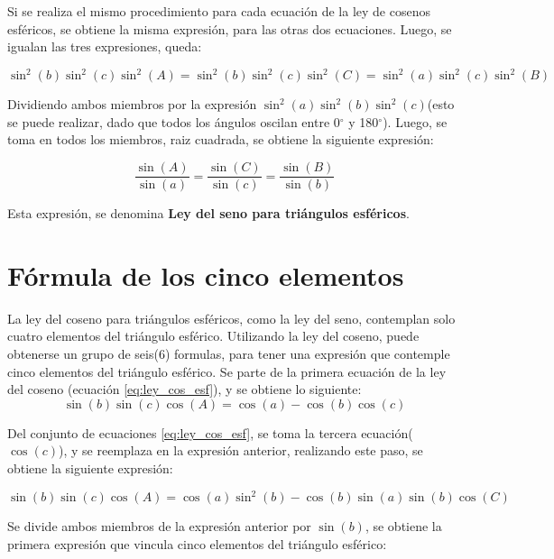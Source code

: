 Si se realiza el mismo procedimiento para cada ecuación de la ley de cosenos esféricos, se obtiene la misma expresión, para las otras dos ecuaciones. Luego, se igualan las tres expresiones, queda: 

\begin{equation*}
	\sin^2(b)\sin^2(c)\sin^2(A) = \sin^2(b)\sin^2(c)\sin^2(C) = \sin^2(a)\sin^2(c)\sin^2(B)   
\end{equation*}

Dividiendo ambos miembros por la expresión $\sin^2(a)\sin^2(b)\sin^2(c)$(esto se puede realizar, dado que todos los ángulos oscilan entre 0$^\circ$ y 180$^\circ$). Luego, se toma en todos los miembros, raiz cuadrada, se obtiene la siguiente expresión: 

\begin{equation}
	\frac{\sin(A)}{\sin(a)} = \frac{\sin(C)}{\sin(c)} = \frac{\sin(B)}{\sin(b)}   
\end{equation}  

Esta expresión, se denomina \textbf{Ley del seno para triángulos esféricos}.


\section{Fórmula de los cinco elementos} 

La ley del coseno para triángulos esféricos, como la ley del seno, contemplan solo cuatro elementos del triángulo esférico. Utilizando la ley del coseno, puede obtenerse un grupo de seis(6) formulas, para tener una expresión que contemple cinco elementos del triángulo esférico. Se parte de la primera ecuación de la ley del coseno (ecuación \ref{eq:ley_cos_esf}), y se obtiene lo siguiente: 
\begin{equation}
	\sin(b)\sin(c)\cos(A) = \cos(a) - \cos(b)\cos(c) 
\end{equation} 

Del conjunto de ecuaciones \ref{eq:ley_cos_esf}, se toma la tercera ecuación($\cos(c)$), y se reemplaza en la expresión anterior, realizando este paso, se obtiene la siguiente expresión: 

\begin{equation}
	\sin(b)\sin(c)\cos(A) = \cos(a)\sin^2(b) - \cos(b)\sin(a)\sin(b)\cos(C) 
\end{equation}

Se divide ambos miembros de la expresión anterior por $\sin(b)$, se obtiene la primera expresión que vincula cinco elementos del triángulo esférico: 

